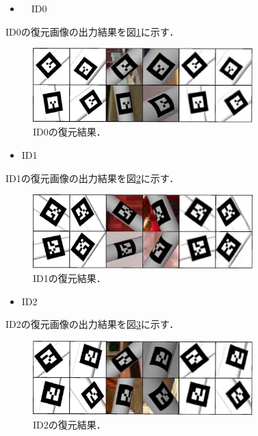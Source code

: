 \begin{itemize}
\item　ID0
\end{itemize}

ID0の復元画像の出力結果を図\ref{i0}に示す．

      \begin{figure}[htbp]
      \begin{center}
      \includegraphics[width=85mm]{figure/eps/F0.eps}
      \caption{ID0の復元結果．}
      \label{i0}
      \end{center}
      \end{figure}
\newpage

\begin{itemize}
\item  ID1
\end{itemize}

ID1の復元画像の出力結果を図\ref{i1}に示す．

      \begin{figure}[htbp]
      \begin{center}
      \includegraphics[width=85mm]{figure/eps/F1.eps}
      \caption{ID1の復元結果．}
      \label{i1}
      \end{center}
      \end{figure}


\begin{itemize}
\item  ID2
\end{itemize}

ID2の復元画像の出力結果を図\ref{i2}に示す．

      \begin{figure}[htbp]
      \begin{center}
      \includegraphics[width=85mm]{figure/eps/F2.eps}
      \caption{ID2の復元結果．}
      \label{i2}
      \end{center}
      \end{figure}


